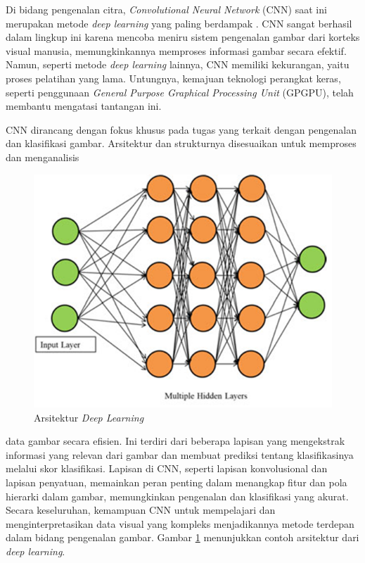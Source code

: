 Di bidang pengenalan citra, \emph{Convolutional Neural Network} (CNN) saat ini merupakan metode \emph{deep learning} yang paling berdampak \parencite{Nugroho}. CNN sangat berhasil dalam lingkup ini karena mencoba meniru sistem pengenalan gambar dari korteks visual manusia, memungkinkannya memproses informasi gambar secara efektif. Namun, seperti metode \emph{deep learning} lainnya, CNN memiliki kekurangan, yaitu proses pelatihan yang lama. Untungnya, kemajuan teknologi perangkat keras, seperti penggunaan \emph{General Purpose Graphical Processing Unit} (GPGPU), telah membantu mengatasi tantangan ini.

CNN dirancang dengan fokus khusus pada tugas yang terkait dengan pengenalan dan klasifikasi gambar. Arsitektur dan strukturnya disesuaikan untuk memproses dan menganalisis 

\begin{figure}[H]
  \centering
  \includegraphics[scale=1.1]{gambar/arsitekturdlnn.png}
  \caption{Arsitektur \emph{Deep Learning} \parencite{Janiesch}}
  \label{fig:arsidl}
\end{figure}

\noindent
data gambar secara efisien. Ini terdiri dari beberapa lapisan yang mengekstrak informasi yang relevan dari gambar dan membuat prediksi tentang klasifikasinya melalui skor klasifikasi. Lapisan di CNN, seperti lapisan konvolusional dan lapisan penyatuan, memainkan peran penting dalam menangkap fitur dan pola hierarki dalam gambar, memungkinkan pengenalan dan klasifikasi yang akurat. Secara keseluruhan, kemampuan CNN untuk mempelajari dan menginterpretasikan data visual yang kompleks menjadikannya metode terdepan dalam bidang pengenalan gambar. Gambar \ref{fig:arsidl} menunjukkan contoh arsitektur dari \emph{deep learning}.

